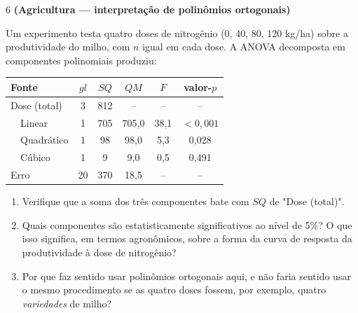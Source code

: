 \documentclass[11pt]{article}
\begin{document}
\begin{questao}{6} \textbf{(Agricultura --- interpretação de polinômios ortogonais)}

Um experimento testa quatro doses de nitrogênio (0, 40, 80, 120 kg/ha) sobre a produtividade do
milho, com $n$ igual em cada dose. A ANOVA decomposta em componentes polinomiais produziu:

\begin{center}
\begin{tabular}{lccccc}
\toprule
Fonte & $gl$ & $SQ$ & $QM$ & $F$ & valor-$p$ \\
\midrule
Dose (total)   & 3 & 812 & --      & --    & --      \\
\ \ Linear     & 1 & 705 & 705{,}0 & 38{,}1 & $<0{,}001$ \\
\ \ Quadrático & 1 & 98  & 98{,}0  & 5{,}3  & 0{,}028 \\
\ \ Cúbico     & 1 & 9   & 9{,}0   & 0{,}5  & 0{,}491 \\
Erro           & 20 & 370 & 18{,}5 & --    & --      \\
\bottomrule
\end{tabular}
\end{center}

\begin{enumerate}[label=(\alph*)]
  \item Verifique que a soma dos três componentes bate com $SQ$ de "Dose (total)".
  \item Quais componentes são estatisticamente significativos ao nível de 5\%? O que isso
    significa, em termos agronômicos, sobre a forma da curva de resposta da produtividade à dose
    de nitrogênio?
  \item Por que faz sentido usar polinômios ortogonais aqui, e não faria sentido usar o mesmo
    procedimento se as quatro doses fossem, por exemplo, quatro \emph{variedades} de milho?
\end{enumerate}
\end{questao}
\end{document}
